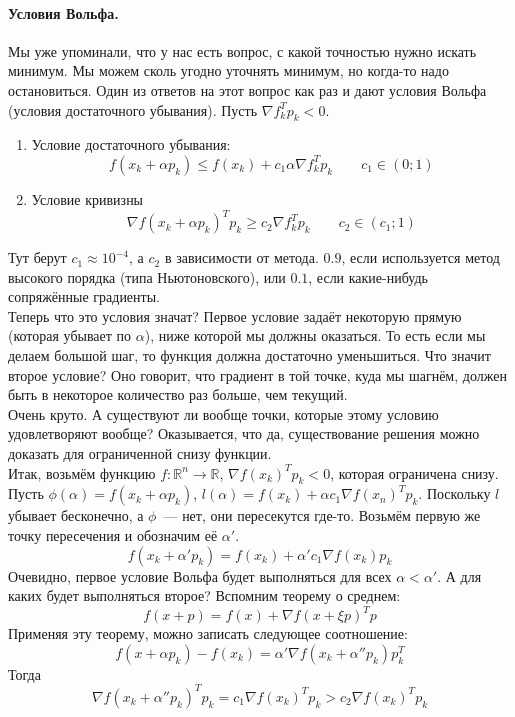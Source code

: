 \documentclass{article}
\begin{document}
    \paragraph{Условия Вольфа.}
    Мы уже упоминали, что у нас есть вопрос, с какой точностью нужно искать минимум. Мы можем сколь угодно уточнять минимум, но когда-то надо остановиться. Один из ответов на этот вопрос как раз и дают условия Вольфа (условия достаточного убывания). Пусть $\nabla f_k^Tp_k<0$.
    \begin{enumerate}
        \item Условие достаточного убывания: $$
        f(x_k+\alpha p_k)\leqslant f(x_k)+c_1\alpha\nabla f_k^Tp_k\qquad c_1\in(0;1)
        $$
        \item Условие кривизны $$
        \nabla f(x_k+\alpha p_k)^Tp_k\geqslant c_2\nabla f_k^Tp_k\qquad c_2\in(c_1;1)
        $$
    \end{enumerate}
    Тут берут $c_1\approx 10^{-4}$, а $c_2$ в зависимости от метода. $0.9$, если используется метод высокого порядка (типа Ньютоновского), или $0.1$, если какие-нибудь сопряжённые градиенты.\\
    Теперь что это условия значат? Первое условие задаёт некоторую прямую (которая убывает по $\alpha$), ниже которой мы должны оказаться. То есть если мы делаем большой шаг, то функция должна достаточно уменьшиться. Что значит второе условие? Оно говорит, что градиент в той точке, куда мы шагнём, должен быть в некоторое количество раз больше, чем текущий.\\
    Очень круто. А существуют ли вообще точки, которые этому условию удовлетворяют вообще? Оказывается, что да, существование решения можно доказать для ограниченной снизу функции.\\
    Итак, возьмём функцию $f\colon\mathbb R^n\to\mathbb R$, $\nabla f(x_k)^Tp_k<0$, которая ограничена снизу. Пусть $\phi(\alpha)=f(x_k+\alpha p_k)$, $l(\alpha)=f(x_k)+\alpha c_1\nabla f(x_n)^Tp_k$. Поскольку $l$ убывает бесконечно, а $\phi$~--- нет, они пересекутся где-то. Возьмём первую же точку пересечения и обозначим её $\alpha'$.
    $$
    f(x_k+\alpha'p_k)=f(x_k)+\alpha'c_1\nabla f(x_k)p_k
    $$
    Очевидно, первое условие Вольфа будет выполняться для всех $\alpha<\alpha'$. А для каких будет выполняться второе? Вспомним теорему о среднем:
    $$
    f(x+p)=f(x)+\nabla f(x+\xi p)^Tp
    $$
    Применяя эту теорему, можно записать следующее соотношение:
    $$
    f(x+\alpha p_k)-f(x_k)=\alpha'\nabla f(x_k+\alpha''p_k)p_k^T
    $$
    Тогда
    $$
    \nabla f(x_k+\alpha''p_k)^Tp_k=c_1\nabla f(x_k)^Tp_k>c_2\nabla f(x_k)^Tp_k
    $$
\end{document}

